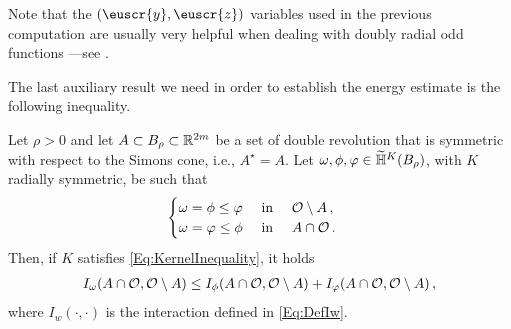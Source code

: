 Note that the $(\euscr{y},\euscr{z})$ variables used in the previous computation are usually very helpful when dealing with doubly radial odd functions ---see \cite{CabreTerraI, CabreTerraII, Cabre-Saddle, Cinti-Saddle,Cinti-Saddle2, Felipe-Sanz-Perela:SaddleFractional}.

The last auxiliary result we need in order to establish the energy estimate is the following inequality.

\begin{lemma}
\label{Lemma:InteractionInequalityMinimumFunction}
Let $\rho>0$ and let $A\subset B_\rho \subset \mathbb{R}^{2m}$ be a set of double revolution that is symmetric with respect to the Simons cone, i.e., $A^\star = A$. Let $\omega, \phi, \varphi \in \widetilde{\mathbb{H}}^K(B_\rho)$, with $K$ radially symmetric, be such that
\begin{equation}
	\label{Eq:InteractionMinHyp}
	\begin{cases}
	\omega = \phi \leq \varphi \ \ \ \ \textrm{in } \ \ \ \mathcal{O} \setminus A\,,\\
	\omega = \varphi \leq \phi \ \ \ \ \textrm{in } \ \ \ A \cap \mathcal{O}\,.
	\end{cases}
\end{equation}
Then, if $K$ satisfies \eqref{Eq:KernelInequality}, it holds
\begin{align*}
I_\omega(A \cap \mathcal{O}, \mathcal{O} \setminus A) \leq I_\phi(A \cap \mathcal{O}, \mathcal{O} \setminus A) + I_\varphi(A \cap \mathcal{O}, \mathcal{O} \setminus A)\,,
\end{align*}
where $I_w(\cdot, \cdot)$ is the interaction defined in \eqref{Eq:DefIw}.
\end{lemma}

